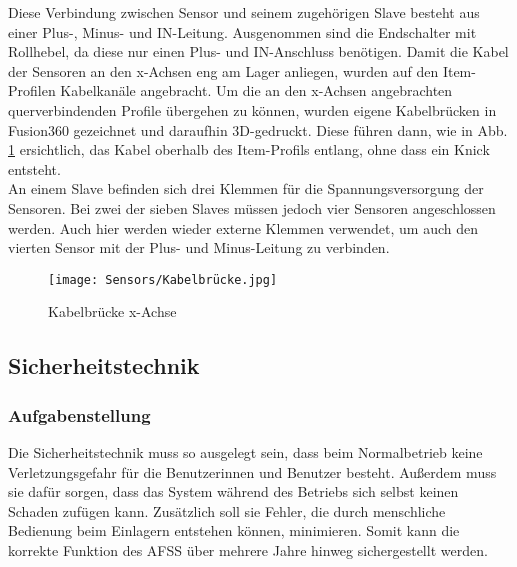 Diese Verbindung zwischen Sensor und seinem zugehörigen Slave besteht aus einer Plus-, Minus- und IN-Leitung. Ausgenommen sind die Endschalter mit Rollhebel, da diese nur einen Plus- und IN-Anschluss benötigen. Damit die Kabel der Sensoren an den x-Achsen eng am Lager anliegen, wurden auf den Item-Profilen Kabelkanäle angebracht. Um die an den x-Achsen angebrachten querverbindenden Profile übergehen zu können, wurden eigene Kabelbrücken in Fusion360 gezeichnet und daraufhin 3D-gedruckt. Diese führen dann, wie in Abb. \ref{Kabelbrücke} ersichtlich, das Kabel oberhalb des Item-Profils entlang, ohne dass ein Knick entsteht.\\
An einem Slave befinden sich drei Klemmen für die Spannungsversorgung der Sensoren. Bei zwei der sieben Slaves müssen jedoch vier Sensoren angeschlossen werden. Auch hier werden wieder externe Klemmen verwendet, um auch den vierten Sensor mit der Plus- und Minus-Leitung zu verbinden.

\begin{figure}[H]
    \centering
    \texttt{[image: Sensors/Kabelbrücke.jpg]}
    \caption{Kabelbrücke x-Achse}
    \label{Kabelbrücke}
\end{figure}

\subsection{Sicherheitstechnik}
\subsubsection{Aufgabenstellung}
Die Sicherheitstechnik muss so ausgelegt sein, dass beim Normalbetrieb keine Verletzungsgefahr für die Benutzerinnen und Benutzer besteht. Außerdem muss sie dafür sorgen, dass das System während des Betriebs sich selbst keinen Schaden zufügen kann. Zusätzlich soll sie Fehler, die durch menschliche Bedienung beim Einlagern entstehen können, minimieren. Somit kann die korrekte Funktion des AFSS über mehrere Jahre hinweg sichergestellt werden.

